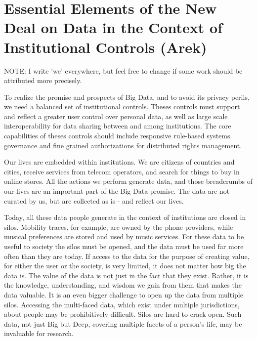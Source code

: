 \section{Essential Elements of the New Deal on Data in the Context of Institutional Controls (Arek)}

NOTE: I write 'we' everywhere, but feel free to change if some work should be attributed more precisely.

To realize the promise and prospects of Big Data, and to avoid its privacy perils, we need a balanced set of institutional controls.
Theses controls must support and reflect a greater user control over personal data, as well as large scale interoperability for data sharing between and among institutions.
The core capabilities of theses controls should include responsive rule-based systems governance and fine grained authorizations for distributed rights management.

Our lives are embedded within institutions. 
We are citizens of countries and cities, receive services from telecom operators, and search for things to buy in online stores. 
All the actions we perform generate data, and those breadcrumbs of our lives are an important part of the Big Data promise.
The data are not curated by us, but are collected as is - and reflect our lives.

Today, all these data people generate in the context of institutions are closed in silos. 
Mobility traces, for example, are owned by the phone providers, while musical preferences are stored and used by music services.
For these data to be useful to society the silos must be opened, and the data must be used far more often than they are today.
If access to the data for the purpose of creating value, for either the user or the society, is very limited, it does not matter how big the data is. 
The value of the data is not just in the fact that they exist.
Rather, it is the knowledge, understanding, and wisdom we gain from them that makes the data valuable.  
It is an even bigger challenge to open up the data from multiple silos.
Accessing the multi-faced data, which exist under multiple jurisdictions, about people may be prohibitively difficult.
Silos are hard to crack open.
Such data, not just Big but Deep, covering multiple facets of a person's life, may be invaluable for research.

